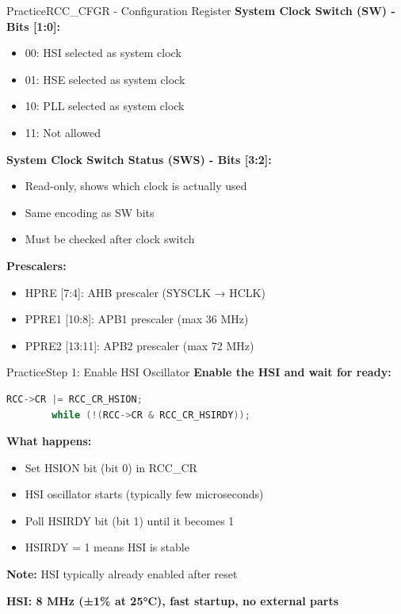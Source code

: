 \documentclass{beamer}
\begin{document}
\begin{frame}{Practice}{RCC\_CFGR - Configuration Register}
	\textbf{System Clock Switch (SW) - Bits [1:0]:}
	\begin{itemize}
		\item 00: HSI selected as system clock
		\item 01: HSE selected as system clock
		\item 10: PLL selected as system clock
		\item 11: Not allowed
	\end{itemize}
	
	\medskip
	\textbf{System Clock Switch Status (SWS) - Bits [3:2]:}
	\begin{itemize}
		\item Read-only, shows which clock is actually used
		\item Same encoding as SW bits
		\item Must be checked after clock switch
	\end{itemize}
	
	\medskip
	\textbf{Prescalers:}
	\begin{itemize}
		\item HPRE [7:4]: AHB prescaler (SYSCLK → HCLK)
		\item PPRE1 [10:8]: APB1 prescaler (max 36 MHz)
		\item PPRE2 [13:11]: APB2 prescaler (max 72 MHz)
	\end{itemize}
\end{frame}

\begin{frame}[fragile]{Practice}{Step 1: Enable HSI Oscillator}
	\textbf{Enable the HSI and wait for ready:}
	\begin{lstlisting}[language=C, basicstyle=\ttfamily\small]
		RCC->CR |= RCC_CR_HSION;
		while (!(RCC->CR & RCC_CR_HSIRDY));
	\end{lstlisting}
	
	\medskip
	\textbf{What happens:}
	\begin{itemize}
		\item Set HSION bit (bit 0) in RCC\_CR
		\item HSI oscillator starts (typically few microseconds)
		\item Poll HSIRDY bit (bit 1) until it becomes 1
		\item HSIRDY = 1 means HSI is stable
	\end{itemize}
	
	\smallskip
	\textbf{Note:} HSI typically already enabled after reset
	
	\smallskip
	\textbf{HSI: 8 MHz (±1\% at 25°C), fast startup, no external parts}
\end{frame}
\end{document}

